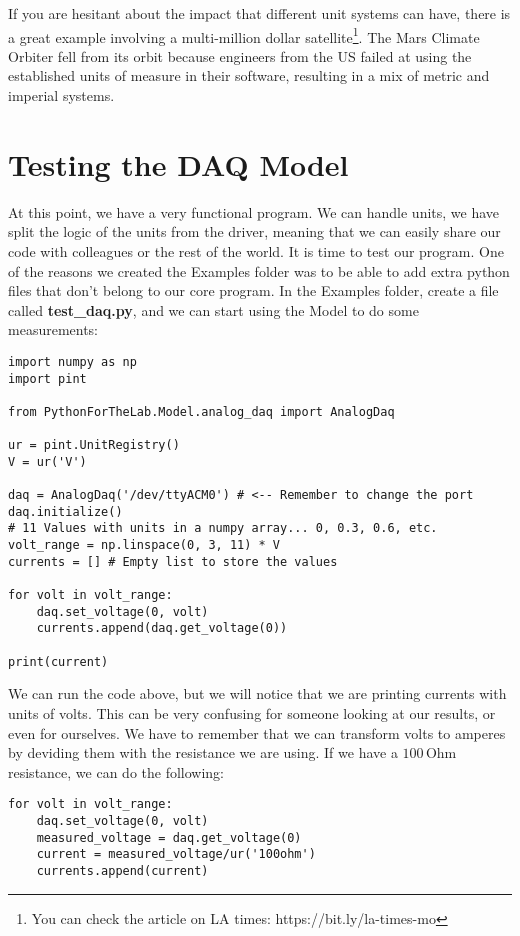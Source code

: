 If you are hesitant about the impact that different unit systems can have, there is a great example involving a multi-million dollar satellite\footnote{You can check the article on LA times: https://bit.ly/la-times-mo}. The Mars Climate Orbiter fell from its orbit because engineers from the US failed at using the established units of measure in their software, resulting in a mix of metric and imperial systems.

\section{Testing the DAQ Model}\label{sec:testing-the-daq-model}
At this point, we have a very functional program. We can handle units, we have split the logic of the units from the driver, meaning that we can easily share our code with colleagues or the rest of the world. It is time to test our program. One of the reasons we created the Examples folder was to be able to add extra python files that don't belong to our core program. In the Examples folder, create a file called \textbf{test\_daq.py}, and we can start using the Model to do some measurements:

\begin{verbatim}
import numpy as np
import pint

from PythonForTheLab.Model.analog_daq import AnalogDaq

ur = pint.UnitRegistry()
V = ur('V')

daq = AnalogDaq('/dev/ttyACM0') # <-- Remember to change the port
daq.initialize()
# 11 Values with units in a numpy array... 0, 0.3, 0.6, etc.
volt_range = np.linspace(0, 3, 11) * V
currents = [] # Empty list to store the values

for volt in volt_range:
    daq.set_voltage(0, volt)
    currents.append(daq.get_voltage(0))

print(current)
\end{verbatim}

We can run the code above, but we will notice that we are printing currents with units of volts. This can be very confusing for someone looking at our results, or even for ourselves. We have to remember that we can transform volts to amperes by deviding them with the resistance we are using. If we have a $100\,\textrm{Ohm}$ resistance, we can do the following:

\begin{verbatim}
for volt in volt_range:
    daq.set_voltage(0, volt)
    measured_voltage = daq.get_voltage(0)
    current = measured_voltage/ur('100ohm')
    currents.append(current)
\end{verbatim}

